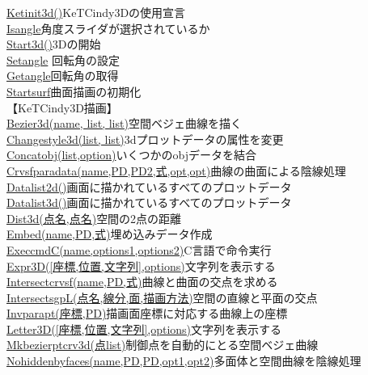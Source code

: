 \documentclass[papersize,a4paper,12pt,uplatex]{jsarticle}
\begin{document}
\begin{tabbing}
\hyperlink{ketinit3d}{Ketinit3d()}\>KeTCindy3Dの使用宣言\\
\hyperlink{isangle}{Isangle}\>角度スライダが選択されているか\\
\hyperlink{start3d}{Start3d()}\>3Dの開始\\
\hyperlink{setangle}{Setangle} \>回転角の設定\\
\hyperlink{getangle}{Getangle}\>回転角の取得\\
\hyperlink{startsurf}{Startsurf}\>曲面描画の初期化\\
\vspace{\baselineskip}
【KeTCindy3D描画】\\
\hyperlink{bezier3d}{Bezier3d(name, list, list)}\>空間ベジェ曲線を描く\\
\hyperlink{changestyle3d}{Changestyle3d(list, list)}\>3dプロットデータの属性を変更\\
\hyperlink{concatobj}{Concatobj(list,option)}\>いくつかのobjデータを結合\\
\hyperlink{crvsfparadata}{Crvsfparadata(name,PD,PD2,式,opt,opt)}\>曲線の曲面による陰線処理\\
\hyperlink{datalist}{Datalist2d()}\>画面に描かれているすべてのプロットデータ\\
\hyperlink{datalist}{Datalist3d()}\>画面に描かれているすべてのプロットデータ\\
\hyperlink{dist3d}{Dist3d(点名,点名)}\>空間の2点の距離\\
\hyperlink{embed}{Embed(name,PD,式)}\>埋め込みデータ作成\\
\hyperlink{execcmdc}{ExeccmdC(name,options1,options2)}\>C言語で命令実行\\
\hyperlink{expr3d}{Expr3D([座標,位置,文字列],options)}\>文字列を表示する\\
\hyperlink{intersectcrvsf}{Intersectcrvsf(name,PD,式)}\>曲線と曲面の交点を求める\\
\hyperlink{intersectsgpL}{IntersectsgpL(点名,線分,面,描画方法)}\>空間の直線と平面の交点\\
\hyperlink{invparapt}{Invparapt(座標,PD)}\>描画面座標に対応する曲線上の座標\\
\hyperlink{letter3d}{Letter3D([座標,位置,文字列],options)}\>文字列を表示する\\
\hyperlink{mkbezierptcrv3d}{Mkbezierptcrv3d(点list)}\>制御点を自動的にとる空間ベジェ曲線\\
\hyperlink{nohiddenbyfaces}{Nohiddenbyfaces(name,PD,PD,opt1,opt2)}\>多面体と空間曲線を陰線処理\\

\end{tabbing}
\end{document}
